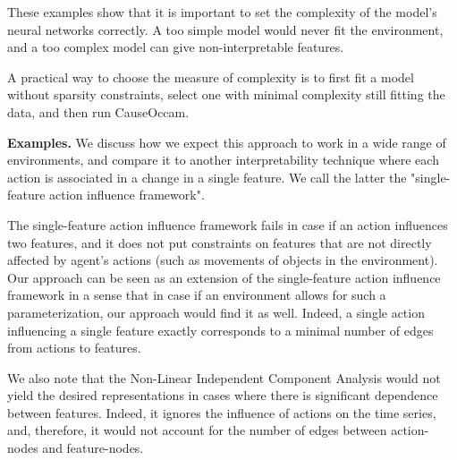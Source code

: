 \documentclass[a4paper,11pt,oneside]{report}
\newcommand{\sysname}{CauseOccam\xspace}
\begin{document}
These examples show that it is important to set the complexity of the model's neural networks correctly. A too simple model would never fit the environment, and a too complex model can give non-interpretable features.

A practical way to choose the measure of complexity is to first fit a model without sparsity constraints, select one with minimal complexity still fitting the data, and then run \sysname.

{\bf Examples.} We discuss how we expect this approach to work in a wide range of environments, and compare it to another interpretability technique where each action is associated \cite{Thomas2018} in a change in a single feature. We call the latter the "single-feature action influence framework".

The single-feature action influence framework fails in case if an action influences two features, and it does not put constraints on features that are not directly affected by agent's actions (such as movements of objects in the environment). Our approach can be seen as an extension of the single-feature action influence framework in a sense that in case if an environment allows for such a parameterization, our approach would find it as well. Indeed, a single action influencing a single feature exactly corresponds to a minimal number of edges from actions to features.

We also note that the Non-Linear Independent Component Analysis \cite{Dinh2015,Hyvarinen2019} would not yield the desired representations in cases where there is significant dependence between features. Indeed, it ignores the influence of actions on the time series, and, therefore, it would not account for the number of edges between action-nodes and feature-nodes.

\end{document}
